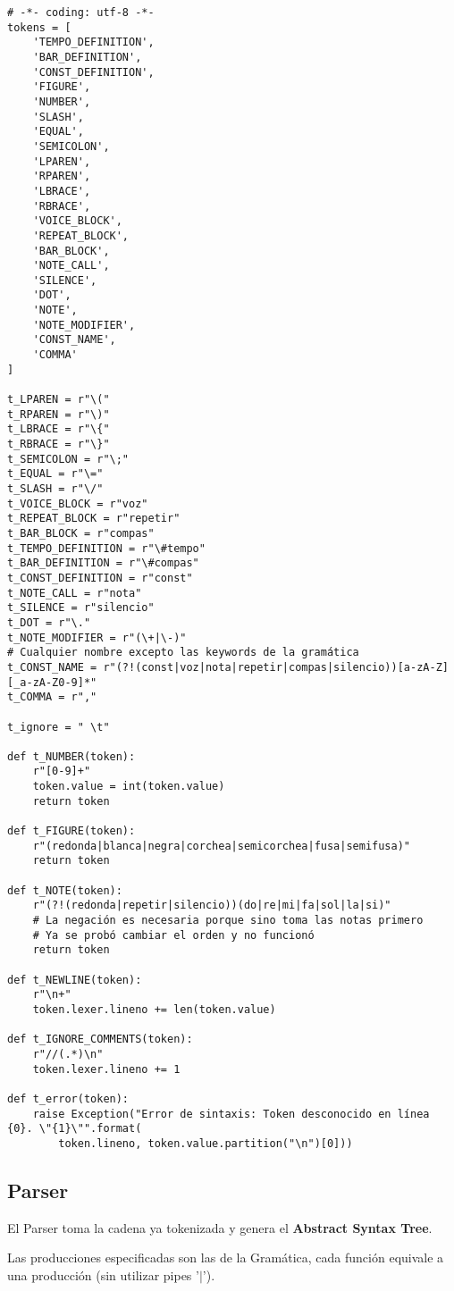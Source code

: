 \begin{verbatim}
# -*- coding: utf-8 -*-
tokens = [
    'TEMPO_DEFINITION',
    'BAR_DEFINITION',
    'CONST_DEFINITION',
    'FIGURE',
    'NUMBER',
    'SLASH',
    'EQUAL',
    'SEMICOLON',
    'LPAREN',
    'RPAREN',
    'LBRACE',
    'RBRACE',
    'VOICE_BLOCK',
    'REPEAT_BLOCK',
    'BAR_BLOCK',
    'NOTE_CALL',
    'SILENCE',
    'DOT',
    'NOTE',
    'NOTE_MODIFIER',
    'CONST_NAME',
    'COMMA'
]

t_LPAREN = r"\("
t_RPAREN = r"\)"
t_LBRACE = r"\{"
t_RBRACE = r"\}"
t_SEMICOLON = r"\;"
t_EQUAL = r"\="
t_SLASH = r"\/"
t_VOICE_BLOCK = r"voz"
t_REPEAT_BLOCK = r"repetir"
t_BAR_BLOCK = r"compas"
t_TEMPO_DEFINITION = r"\#tempo"
t_BAR_DEFINITION = r"\#compas"
t_CONST_DEFINITION = r"const"
t_NOTE_CALL = r"nota"
t_SILENCE = r"silencio"
t_DOT = r"\."
t_NOTE_MODIFIER = r"(\+|\-)"
# Cualquier nombre excepto las keywords de la gramática
t_CONST_NAME = r"(?!(const|voz|nota|repetir|compas|silencio))[a-zA-Z][_a-zA-Z0-9]*"
t_COMMA = r","

t_ignore = " \t"

def t_NUMBER(token):
    r"[0-9]+"
    token.value = int(token.value)
    return token

def t_FIGURE(token):
    r"(redonda|blanca|negra|corchea|semicorchea|fusa|semifusa)"
    return token

def t_NOTE(token):
    r"(?!(redonda|repetir|silencio))(do|re|mi|fa|sol|la|si)"
    # La negación es necesaria porque sino toma las notas primero
    # Ya se probó cambiar el orden y no funcionó
    return token

def t_NEWLINE(token):
    r"\n+"
    token.lexer.lineno += len(token.value)

def t_IGNORE_COMMENTS(token):
    r"//(.*)\n"
    token.lexer.lineno += 1

def t_error(token):
    raise Exception("Error de sintaxis: Token desconocido en línea {0}. \"{1}\"".format(
        token.lineno, token.value.partition("\n")[0]))

\end{verbatim}

\newpage

\subsection{Parser}

El Parser toma la cadena ya tokenizada y genera el \textbf{Abstract Syntax Tree}.

Las producciones especificadas son las de la Gramática, cada función equivale a una producción (sin utilizar pipes '$\vert$').

